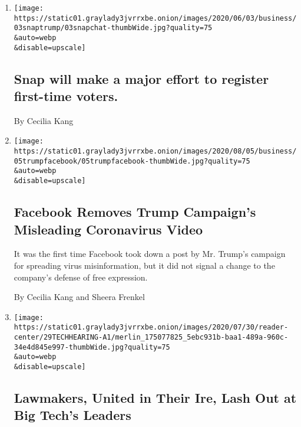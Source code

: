 \begin{enumerate}
\def\labelenumi{\arabic{enumi}.}
\item
  \href{/2020/08/06/business/snap-will-make-a-major-effort-to-register-first-time-voters.html}{}

  \texttt{[image: https://static01.graylady3jvrrxbe.onion/images/2020/06/03/business/03snaptrump/03snapchat-thumbWide.jpg?quality=75\\\&auto=webp\\\&disable=upscale]}

  \hypertarget{snap-will-make-a-major-effort-to-register-first-time-voters}{%
  \subsection{Snap will make a major effort to register first-time
  voters.}\label{snap-will-make-a-major-effort-to-register-first-time-voters}}

  By Cecilia Kang
\item
  \href{/2020/08/05/technology/trump-facebook-coronavirus-video.html}{}

  \texttt{[image: https://static01.graylady3jvrrxbe.onion/images/2020/08/05/business/05trumpfacebook/05trumpfacebook-thumbWide.jpg?quality=75\\\&auto=webp\\\&disable=upscale]}

  \hypertarget{facebook-removes-trump-campaigns-misleading-coronavirus-video}{%
  \subsection{Facebook Removes Trump Campaign's Misleading Coronavirus
  Video}\label{facebook-removes-trump-campaigns-misleading-coronavirus-video}}

  It was the first time Facebook took down a post by Mr. Trump's
  campaign for spreading virus misinformation, but it did not signal a
  change to the company's defense of free expression.

  By Cecilia Kang and Sheera Frenkel
\item
  \href{/2020/07/29/technology/big-tech-hearing-apple-amazon-facebook-google.html}{}

  \texttt{[image: https://static01.graylady3jvrrxbe.onion/images/2020/07/30/reader-center/29TECHHEARING-A1/merlin\_175077825\_5ebc931b-baa1-489a-960c-34e4d845e997-thumbWide.jpg?quality=75\\\&auto=webp\\\&disable=upscale]}

  \hypertarget{lawmakers-united-in-their-ire-lash-out-at-big-techs-leaders}{%
  \subsection{Lawmakers, United in Their Ire, Lash Out at Big Tech's
  Leaders}\label{lawmakers-united-in-their-ire-lash-out-at-big-techs-leaders}}


\end{enumerate}
